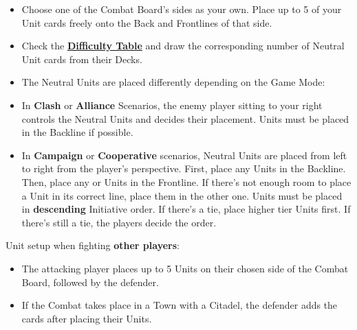 \begin{multicols}{2}
\begin{itemize}
  \item Choose one of the Combat Board's sides as your own.
    Place up to 5 of your Unit cards freely onto the Back and Frontlines of that side.
  \item Check the \hyperlink{Difficulty Table}{\textbf{Difficulty Table}} \iftoggle{printable}{(on the back cover)}{} and draw the corresponding number of Neutral Unit cards from their Decks.
  \item The Neutral Units are placed differently depending on the Game Mode:
  \item In \textbf{Clash} or \textbf{Alliance} Scenarios, the enemy player sitting to your right controls the Neutral Units and decides their placement.
     Units must be placed in the Backline if possible.
  \item In \textbf{Campaign} or \textbf{Cooperative} scenarios, Neutral Units are placed from left to right from the player's perspective.
First, place any  Units in the Backline.
Then, place any  or  Units in the Frontline.
If there's not enough room to place a Unit in its correct line, place them in the other one.
Units must be placed in \textbf{descending} Initiative order.
If there's a tie, place higher tier Units first.
If there's still a tie, the players decide the order.
\end{itemize}
Unit setup when fighting \textbf{other players}:
\begin{itemize}[wide]
  \item The attacking player places up to 5 Units on their chosen side of the Combat Board, followed by the defender.
  \item If the Combat takes place in a Town with a Citadel, the defender adds the  cards after placing their Units.
\end{itemize}

\vfill



\end{multicols}
